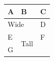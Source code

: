 \begin{tabular}{lll}
A & B & C \\
\hline
\multicolumn{2}{l}{Wide} & D \\
E & \multirow{2}{*}{Tall} & F \\
G & H \\
\end{tabular}
